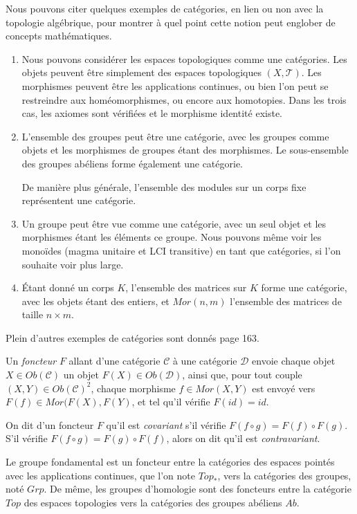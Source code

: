 \begin{exemple}Nous pouvons citer quelques exemples de catégories, en lien ou non avec la topologie algébrique, pour montrer à quel point cette notion peut englober de concepts mathématiques.
\begin{enumerate}
    \item Nous pouvons considérer les espaces topologiques comme une catégories. Les objets peuvent être simplement des espaces topologiques $(X,\mathcal{T})$. Les morphismes peuvent être les applications continues, ou bien l'on peut se restreindre aux homéomorphismes, ou encore aux homotopies. Dans les trois cas, les axiomes sont vérifiées et le morphisme identité existe.
    \item L'ensemble des groupes peut être une catégorie, avec les groupes comme objets et les morphismes de groupes étant des morphismes. Le sous-ensemble des groupes abéliens forme également une catégorie.

    De manière plus générale, l'ensemble des modules sur un corps fixe représentent une catégorie.
    \item Un groupe peut être vue comme une catégorie, avec un seul objet et les morphismes étant les éléments ce groupe. Nous pouvons même voir les monoïdes (magma unitaire et LCI transitive) en tant que catégories, si l'on souhaite voir plus large.
    \item Étant donné un corps $K$, l'ensemble des matrices sur $K$ forme une catégorie, avec les objets étant des entiers, et $Mor(n,m)$ l'ensemble des matrices de taille $n\times m$.
\end{enumerate}
Plein d'autres exemples de catégories sont donnés \cite{Hatcher} page 163.
\end{exemple}

\begin{definition}\label{def:functor}
Un \emph{foncteur} $F$ allant d'une catégorie $\mathcal{C}$ à une catégorie $\mathcal{D}$ envoie chaque objet~${X\in Ob(\mathcal{C})}$ un objet $F(X)\in Ob(\mathcal{D})$, ainsi que, pour tout couple $(X,Y)\in Ob(\mathcal{C})^2$, chaque morphisme $f\in Mor(X,Y)$ est envoyé vers~${F(f)\in Mor(F(X),F(Y)}$, et tel qu'il vérifie $F(id)=id$.

On dit d'un foncteur $F$ qu'il est \emph{covariant} s'il vérifie $F(f\circ g)=F(f)\circ F(g)$. S'il vérifie $F(f\circ g)=F(g)\circ F(f)$, alors on dit qu'il est \emph{contravariant}.
\end{definition}

\begin{exemple}
Le groupe fondamental est un foncteur entre la catégories des espaces pointés avec les applications continues, que l'on note $Top_\ast$, vers la catégories des groupes, noté $Grp$. De même, les groupes d'homologie sont des foncteurs entre la catégorie $Top$ des espaces topologies vers la catégories des groupes abéliens $Ab$.
\end{exemple}


